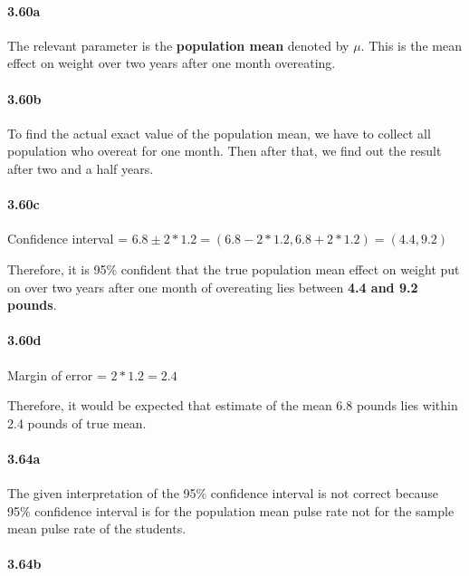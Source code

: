 \documentclass[
]{article}
\begin{document}
\hypertarget{a-6}{%
\paragraph{3.60a}\label{a-6}}

The relevant parameter is the \textbf{population mean} denoted by
\(\mu\). This is the mean effect on weight over two years after one
month overeating.

\hypertarget{b-6}{%
\paragraph{3.60b}\label{b-6}}

To find the actual exact value of the population mean, we have to
collect all population who overeat for one month. Then after that, we
find out the result after two and a half years.

\hypertarget{c-4}{%
\paragraph{3.60c}\label{c-4}}

Confidence interval =
\(6.8 \pm 2*1.2 = (6.8-2 * 1.2, 6.8+2*1.2) = (4.4,9.2)\)

Therefore, it is 95\% confident that the true population mean effect on
weight put on over two years after one month of overeating lies between
\textbf{4.4 and 9.2 pounds}.

\hypertarget{d-2}{%
\paragraph{3.60d}\label{d-2}}

Margin of error = \(2*1.2 = 2.4\)

Therefore, it would be expected that estimate of the mean 6.8 pounds
lies within 2.4 pounds of true mean.

\hypertarget{a-7}{%
\paragraph{3.64a}\label{a-7}}

The given interpretation of the 95\% confidence interval is not correct
because 95\% confidence interval is for the population mean pulse rate
not for the sample mean pulse rate of the students.

\hypertarget{b-7}{%
\paragraph{3.64b}\label{b-7}}
\end{document}
